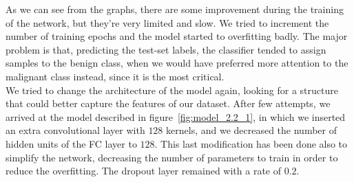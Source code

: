 \documentclass[11pt,a4paper,oneside]{article}
\begin{document}
As we can see from the graphs, there are some improvement during the training of the network, but they're very limited and slow. We tried to increment the number of training epochs and the model started to overfitting badly. The major problem is that, predicting the test-set labels, the classifier tended to assign samples to the benign class, when we would have preferred more attention to the malignant class instead, since it is the most critical.\\


We tried to change the architecture of the model again, looking for a structure that could better capture the features of our dataset. After few attempts, we arrived at the model described in figure~\ref{fig:model_2.2_1}, in which we inserted an extra convolutional layer with $128$ kernels, and we decreased the number of hidden units of the FC layer to $128$. This last modification has been done also to simplify the network, decreasing the number of parameters to train in order to reduce the overfitting. The dropout layer remained with a rate of $0.2$.
\end{document}
